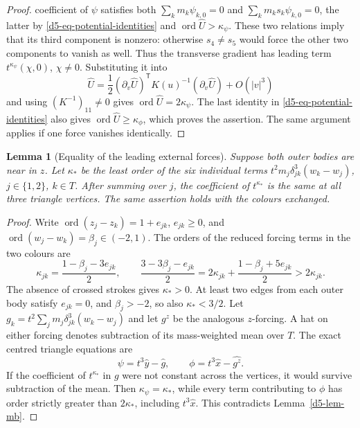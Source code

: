 \documentclass[Threeside,11pt]{article}
\newtheorem{lemma}[theorem]{Lemma}
\theoremstyle{definition}
\theoremstyle{remark}
\numberwithin{equation}{section}
\theoremstyle{remark}
\newcommand{\ord}{\operatorname{ord}}
\begin{document}
{\begin{proof}
coefficient of $\psi$ satisfies both $\sum_km_k\psi_{k,0}=0$ and
$\sum_km_ks_k\psi_{k,0}=0$, the latter by
\eqref{d5-eq-potential-identities} and $\ord\widehat U>\kappa_\psi$.
These two relations imply that its third component is nonzero: otherwise
$s_4\ne s_5$ would force the other two components to vanish as well.
Thus the transverse gradient has leading term
$t^{\kappa_\psi}(\chi,0)$, $\chi\ne0$.  Substituting it into
\[
 \widehat U=\frac12(\partial_v\widehat U)^{\mathsf T}K(u)^{-1}
 (\partial_v\widehat U)+O(|v|^3)
\]
and using $(K^{-1})_{11}\ne0$ gives $\ord\widehat U=2\kappa_\psi$.
The last identity in \eqref{d5-eq-potential-identities} also gives
$\ord\widehat U\ge\kappa_\phi$, which proves the assertion.
The same argument applies if one force vanishes identically.
\end{proof}

\begin{lemma}[Equality of the leading external forces]\label{d5-lem-uniform}
Suppose both outer bodies are near in $z$.  Let $\kappa_*$ be the least order of
the six individual terms $t^2m_j\delta_{jk}^3(w_k-w_j)$, $j\in\{1,2\}$, $k\in T$.
After summing over $j$, the coefficient of $t^{\kappa_*}$ is the same at all
three triangle vertices.  The same assertion holds with the colours exchanged.
\end{lemma}
\begin{proof}
Write $\ord(z_j-z_k)=1+e_{jk}$, $e_{jk}\ge0$, and
$\ord(w_j-w_k)=\beta_j\in(-2,1)$.  The orders of the reduced forcing terms in
the two colours are
\[
 \kappa_{jk}=\frac{1-\beta_j-3e_{jk}}2,
 \qquad
 \frac{3-3\beta_j-e_{jk}}2
 =2\kappa_{jk}+\frac{1-\beta_j+5e_{jk}}2>2\kappa_{jk}.
\]
The absence of crossed strokes gives $\kappa_*>0$.  At least two edges from each outer body satisfy $e_{jk}=0$, and $\beta_j>-2$, so also $\kappa_*<3/2$.
Let $g_k=t^2\sum_jm_j\delta_{jk}^3(w_k-w_j)$ and let $g^z$ be the analogous
$z$-forcing.  A hat on either forcing denotes subtraction of its mass-weighted
mean over $T$.  The exact centred triangle equations are
\[
 \psi=t^3\hat y-\widehat g,\qquad
 \phi=t^3\hat x-\widehat {g^z}.
\]
If the coefficient of $t^{\kappa_*}$ in $g$ were not constant across the
vertices, it would survive subtraction of the mean.  Then
$\kappa_\psi=\kappa_*$, while every term contributing to $\phi$ has order
strictly greater than $2\kappa_*$, including $t^3\hat x$.
This contradicts Lemma~\ref{d5-lem-mb}.
\end{proof}

}
\end{document}
